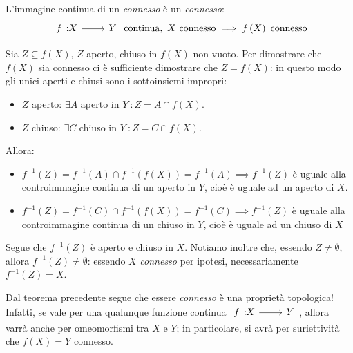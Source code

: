 \begin{theorema}~{}\\
	L'immagine continua di un \textit{connesso} è un \textit{connesso}:
	\begin{equation}
		\funz{f}{X}{Y}\text{ continua},\ X\text{ connesso}\implies f\left(X\right)\text{ connesso}
	\end{equation}
\vspace{-6mm}
\end{theorema}
\begin{demonstration}
	Sia $Z\subseteq f\left(X\right)$, $Z$ aperto, chiuso in $f\left(X\right)$ non vuoto. Per dimostrare che $f\left(X\right)$ sia connesso ci è sufficiente dimostrare che $Z=f\left(X\right)$: in questo modo gli unici aperti e chiusi sono i sottoinsiemi impropri:
	\begin{itemize}
		\item $Z$ aperto: $\exists A$ aperto in $Y\ \colon Z=A\cap f\left(X\right)$.
		\item $Z$ chiuso: $\exists C$ chiuso in $Y\ \colon Z=C\cap f\left(X\right)$.
	\end{itemize}
Allora:
	\begin{itemize}
	\item $f^{-1}\left(Z\right)=f^{-1}\left(A\right)\cap f^{-1}\left(f\left(X\right)\right)=f^{-1}\left(A\right)\implies f^{-1}\left(Z\right)$ è uguale alla controimmagine continua di un aperto in $Y$, cioè è uguale ad un aperto di $X$.
	\item $f^{-1}\left(Z\right)=f^{-1}\left(C\right)\cap f^{-1}\left(f\left(X\right)\right)=f^{-1}\left(C\right)\implies f^{-1}\left(Z\right)$ è uguale alla controimmagine continua di un chiuso in $Y$, cioè è uguale ad un chiuso di $X$
	\end{itemize}
Segue che $f^{-1}\left(Z\right)$ è aperto e chiuso in $X$. Notiamo inoltre che, essendo $Z\neq \emptyset$, allora $f^{-1}\left(Z\right)\neq \emptyset$: essendo $X$ \textit{connesso} per ipotesi, necessariamente $f^{-1}\left(Z\right)=X$.
\end{demonstration}
\begin{observe}
Dal teorema precedente segue che essere \textit{connesso} è una proprietà topologica! Infatti, se vale per una qualunque funzione continua $\funz{f}{X}{Y}$, allora varrà anche per omeomorfismi tra $X$ e $Y$; in particolare, si avrà per suriettività che $f\left(X\right)=Y$ connesso.
\end{observe}
